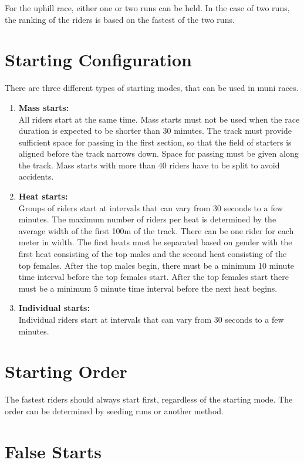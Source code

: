 For the uphill race, either one or two runs can be held.
In the case of two runs, the ranking of the riders is based on the fastest of the two runs.

\section{Starting Configuration  \label{sec:muni_starting-configuration}}

There are three different types of starting modes, that can be used in muni races.
\begin{enumerate}
\item \textbf{Mass starts:}\\
All riders start at the same time.
Mass starts must not be used when the race duration is expected to be shorter than 30 minutes.
The track must provide sufficient space for passing in the first section, so that the field of starters is aligned before the track narrows down.
Space for passing must be given along the track.
Mass starts with more than 40 riders have to be split to avoid accidents.
\item \textbf{Heat starts:}\\
Groups of riders start at intervals that can vary from 30 seconds to a few minutes.
The maximum number of riders per heat is determined by the average width of the first 100m of the track.
There can be one rider for each meter in width.
The first heats must be separated based on gender with the first heat consisting of the top males and the second heat consisting of the top females.
After the top males begin, there must be a minimum 10 minute time interval before the top females start.
After the top females start there must be a minimum 5 minute time interval before the next heat begins.
\item \textbf{Individual starts:}\\
Individual riders start at intervals that can vary from 30 seconds to a few minutes.
\end{enumerate}

\section{Starting Order}

The fastest riders should always start first, regardless of the starting mode.
The order can be determined by seeding runs or another method.

\section{False Starts}

